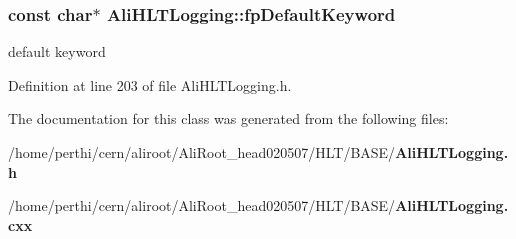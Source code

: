 \subsubsection{\setlength{\rightskip}{0pt plus 5cm}const char$\ast$ {\bf Ali\-HLTLogging::fp\-Default\-Keyword}\hspace{0.3cm}{\tt  [private]}}\label{classAliHLTLogging_r1}


default keyword 

Definition at line 203 of file Ali\-HLTLogging.h.

The documentation for this class was generated from the following files:\begin{CompactItemize}
\item 
/home/perthi/cern/aliroot/Ali\-Root\_\-head020507/HLT/BASE/{\bf Ali\-HLTLogging.h}\item 
/home/perthi/cern/aliroot/Ali\-Root\_\-head020507/HLT/BASE/{\bf Ali\-HLTLogging.cxx}\end{CompactItemize}
